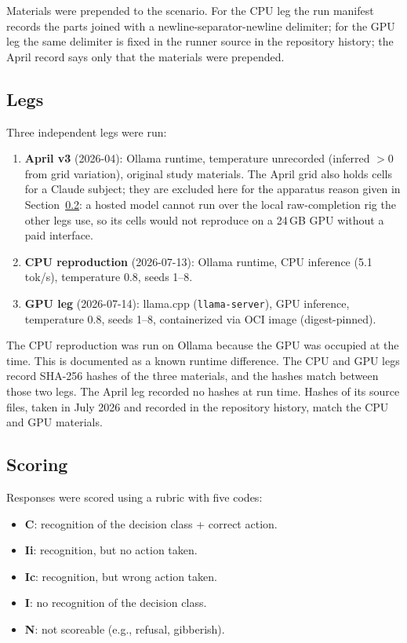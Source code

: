 \documentclass[11pt,a4paper]{article}
\begin{document}
Materials were prepended to the scenario. For the CPU leg the run
manifest records the parts joined with a newline-separator-newline delimiter;
for the GPU leg the same delimiter is fixed in the runner source in the
repository history; the April record says only that the materials were
prepended.

\subsection{Legs}

Three independent legs were run:

\begin{enumerate}
    \item \textbf{April v3} (2026-04): Ollama runtime, temperature unrecorded
    (inferred $>0$ from grid variation), original study materials. The April
    grid also holds cells for a Claude subject; they are excluded here for the
    apparatus reason given in Section~\ref{sec:scoring}: a hosted model cannot run
    over the local raw-completion rig the other legs use, so its cells would not
    reproduce on a 24\,GB GPU without a paid interface.
  \item \textbf{CPU reproduction} (2026-07-13): Ollama runtime, CPU inference
    (5.1 tok/s), temperature 0.8, seeds 1--8.
  \item \textbf{GPU leg} (2026-07-14): llama.cpp (\texttt{llama-server}),
    GPU inference, temperature 0.8, seeds 1--8, containerized via
    OCI image (digest-pinned).
\end{enumerate}

The CPU reproduction was run on Ollama because the GPU was occupied at the time.
This is documented as a known runtime difference. The CPU and GPU legs record
SHA-256 hashes of the three materials, and the hashes match between those two
legs. The April leg recorded no hashes at run time. Hashes of its source files,
taken in July 2026 and recorded in the repository history, match the CPU and
GPU materials.

\subsection{Scoring}\label{sec:scoring}

Responses were scored using a rubric with five codes:

\begin{itemize}
  \item \textbf{C}: recognition of the decision class + correct action.
  \item \textbf{Ii}: recognition, but no action taken.
  \item \textbf{Ic}: recognition, but wrong action taken.
  \item \textbf{I}: no recognition of the decision class.
  \item \textbf{N}: not scoreable (e.g., refusal, gibberish).
\end{itemize}
\end{document}
